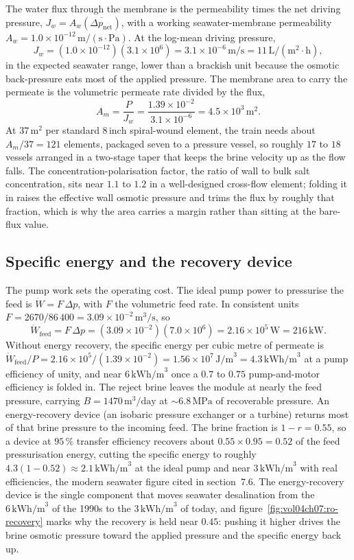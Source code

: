 The water flux through the membrane is the permeability times the net
driving pressure, $J_w = A_w(\overline{\Delta p_{\text{net}}})$, with a
working seawater-membrane permeability $A_w = 1.0\times 10^{-12}\,\text{m}
/(\text{s}\cdot\text{Pa})$. At the log-mean driving pressure,
\[
J_w = (1.0\times 10^{-12})(3.1\times 10^{6}) = 3.1\times 10^{-6}\,
\text{m/s} = 11\,\text{L}/(\text{m}^2\cdot\text{h}),
\]
in the expected seawater range, lower than a brackish unit because the
osmotic back-pressure eats most of the applied pressure. The membrane
area to carry the permeate is the volumetric permeate rate divided by the
flux,
\[
A_m = \frac{P}{J_w} = \frac{1.39\times 10^{-2}}{3.1\times 10^{-6}} =
4.5\times 10^{3}\,\text{m}^2.
\]
At $37\,\text{m}^2$ per standard $8\,\text{inch}$ spiral-wound element,
the train needs about $A_m/37 = 121$ elements, packaged seven to a
pressure vessel, so roughly $17$ to $18$ vessels arranged in a two-stage
taper that keeps the brine velocity up as the flow falls. The
concentration-polarisation factor, the ratio of wall to bulk salt
concentration, sits near $1.1$ to $1.2$ in a well-designed cross-flow
element; folding it in raises the effective wall osmotic pressure and
trims the flux by roughly that fraction, which is why the area carries a
margin rather than sitting at the bare-flux value.

\subsection{Specific energy and the recovery device}

The pump work sets the operating cost. The ideal pump power to pressurise
the feed is $\dot W = F\,\Delta p$, with $F$ the volumetric feed rate. In
consistent units $F = 2670/86\,400 = 3.09\times 10^{-2}\,\text{m}^3/
\text{s}$, so
\[
\dot W_{\text{feed}} = F\,\Delta p = (3.09\times 10^{-2})(7.0\times
10^{6}) = 2.16\times 10^{5}\,\text{W} = 216\,\text{kW}.
\]
Without energy recovery, the specific energy per cubic metre of permeate
is $\dot W_{\text{feed}}/P = 2.16\times 10^{5}/(1.39\times 10^{-2}) =
1.56\times 10^{7}\,\text{J/m}^3 = 4.3\,\text{kWh/m}^3$ at a pump
efficiency of unity, and near $6\,\text{kWh/m}^3$ once a $0.7$ to $0.75$
pump-and-motor efficiency is folded in. The reject brine leaves the module
at nearly the feed pressure, carrying $B = 1470\,\text{m}^3/\text{day}$ at
$\sim 6.8\,\text{MPa}$ of recoverable pressure. An energy-recovery device
(an isobaric pressure exchanger or a turbine) returns most of that brine
pressure to the incoming feed. The brine fraction is $1 - r = 0.55$, so a
device at $95\,\%$ transfer efficiency recovers about
$0.55\times 0.95 = 0.52$ of the feed pressurisation energy, cutting the
specific energy to roughly $4.3(1 - 0.52) \approx 2.1\,\text{kWh/m}^3$ at
the ideal pump and near $3\,\text{kWh/m}^3$ with real efficiencies, the
modern seawater figure cited in section~7.6. The energy-recovery device
is the single component that moves seawater desalination from the
$6\,\text{kWh/m}^3$ of the 1990s to the $3\,\text{kWh/m}^3$ of today,
and figure~\ref{fig:vol04ch07:ro-recovery} marks why the recovery is held
near $0.45$: pushing it higher drives the brine osmotic pressure toward
the applied pressure and the specific energy back up.

